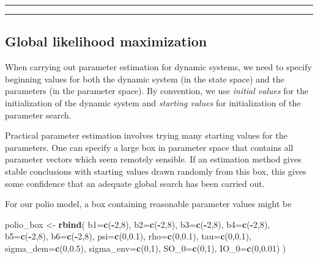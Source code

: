 \documentclass[]{article}
\newenvironment{Shaded}{\begin{snugshade}}{\end{snugshade}}
\newcommand{\KeywordTok}[1]{\textcolor[rgb]{0.13,0.29,0.53}{\textbf{#1}}}
\newcommand{\DataTypeTok}[1]{\textcolor[rgb]{0.13,0.29,0.53}{#1}}
\newcommand{\DecValTok}[1]{\textcolor[rgb]{0.00,0.00,0.81}{#1}}
\newcommand{\FloatTok}[1]{\textcolor[rgb]{0.00,0.00,0.81}{#1}}
\newcommand{\StringTok}[1]{\textcolor[rgb]{0.31,0.60,0.02}{#1}}
\newcommand{\OperatorTok}[1]{\textcolor[rgb]{0.81,0.36,0.00}{\textbf{#1}}}
\newcommand{\NormalTok}[1]{#1}
\begin{document}
\begin{center}\rule{0.5\linewidth}{\linethickness}\end{center}

\begin{center}\rule{0.5\linewidth}{\linethickness}\end{center}

\subsection{Global likelihood
maximization}\label{global-likelihood-maximization}

When carrying out parameter estimation for dynamic systems, we need to
specify beginning values for both the dynamic system (in the state
space) and the parameters (in the parameter space). By convention, we
use \emph{initial values} for the initialization of the dynamic system
and \emph{starting values} for initialization of the parameter search.

Practical parameter estimation involves trying many starting values for
the parameters. One can specify a large box in parameter space that
contains all parameter vectors which seem remotely sensible. If an
estimation method gives stable conclusions with starting values drawn
randomly from this box, this gives some confidence that an adequate
global search has been carried out.

For our polio model, a box containing reasonable parameter values might
be

\begin{Shaded}
\begin{Highlighting}[]
\NormalTok{polio_box <-}\StringTok{ }\KeywordTok{rbind}\NormalTok{(}
  \DataTypeTok{b1=}\KeywordTok{c}\NormalTok{(}\OperatorTok{-}\DecValTok{2}\NormalTok{,}\DecValTok{8}\NormalTok{),}
  \DataTypeTok{b2=}\KeywordTok{c}\NormalTok{(}\OperatorTok{-}\DecValTok{2}\NormalTok{,}\DecValTok{8}\NormalTok{),}
  \DataTypeTok{b3=}\KeywordTok{c}\NormalTok{(}\OperatorTok{-}\DecValTok{2}\NormalTok{,}\DecValTok{8}\NormalTok{),}
  \DataTypeTok{b4=}\KeywordTok{c}\NormalTok{(}\OperatorTok{-}\DecValTok{2}\NormalTok{,}\DecValTok{8}\NormalTok{),}
  \DataTypeTok{b5=}\KeywordTok{c}\NormalTok{(}\OperatorTok{-}\DecValTok{2}\NormalTok{,}\DecValTok{8}\NormalTok{),}
  \DataTypeTok{b6=}\KeywordTok{c}\NormalTok{(}\OperatorTok{-}\DecValTok{2}\NormalTok{,}\DecValTok{8}\NormalTok{),}
  \DataTypeTok{psi=}\KeywordTok{c}\NormalTok{(}\DecValTok{0}\NormalTok{,}\FloatTok{0.1}\NormalTok{),}
  \DataTypeTok{rho=}\KeywordTok{c}\NormalTok{(}\DecValTok{0}\NormalTok{,}\FloatTok{0.1}\NormalTok{),}
  \DataTypeTok{tau=}\KeywordTok{c}\NormalTok{(}\DecValTok{0}\NormalTok{,}\FloatTok{0.1}\NormalTok{),}
  \DataTypeTok{sigma_dem=}\KeywordTok{c}\NormalTok{(}\DecValTok{0}\NormalTok{,}\FloatTok{0.5}\NormalTok{),}
  \DataTypeTok{sigma_env=}\KeywordTok{c}\NormalTok{(}\DecValTok{0}\NormalTok{,}\DecValTok{1}\NormalTok{),}
  \DataTypeTok{SO_0=}\KeywordTok{c}\NormalTok{(}\DecValTok{0}\NormalTok{,}\DecValTok{1}\NormalTok{),}
  \DataTypeTok{IO_0=}\KeywordTok{c}\NormalTok{(}\DecValTok{0}\NormalTok{,}\FloatTok{0.01}\NormalTok{)}
\NormalTok{)}
\end{Highlighting}
\end{Shaded}
\end{document}
